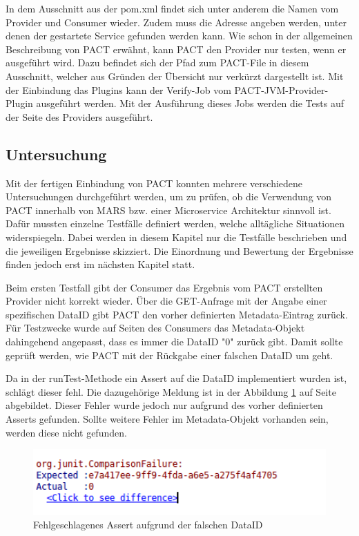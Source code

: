 \documentclass{llncs}
\begin{document}
In dem Ausschnitt aus der pom.xml findet sich unter anderem die Namen vom Provider und Consumer wieder. Zudem muss die Adresse angeben werden, unter denen der gestartete Service gefunden werden kann. Wie schon in der allgemeinen Beschreibung von PACT erwähnt, kann PACT den Provider nur testen, wenn er ausgeführt wird. Dazu befindet sich der Pfad zum PACT-File in diesem Ausschnitt, welcher aus Gründen der Übersicht nur verkürzt dargestellt ist.
Mit der Einbindung das Plugins kann der Verify-Job vom  PACT-JVM-Provider-Plugin ausgeführt werden. Mit der Ausführung dieses Jobs werden die Tests auf der Seite des Providers ausgeführt.

\subsection{Untersuchung}
Mit der fertigen Einbindung von PACT konnten mehrere verschiedene Untersuchungen durchgeführt werden, um zu prüfen, ob die Verwendung von PACT innerhalb von MARS bzw. einer Microservice Architektur sinnvoll ist. Dafür mussten einzelne Testfälle definiert werden, welche alltägliche Situationen widerspiegeln. Dabei werden in diesem Kapitel nur die Testfälle beschrieben und die jeweiligen Ergebnisse skizziert. Die Einordnung und Bewertung der Ergebnisse finden jedoch erst im nächsten Kapitel statt.

Beim ersten Testfall gibt der Consumer das Ergebnis vom PACT erstellten Provider nicht korrekt wieder. Über die GET-Anfrage mit der Angabe einer spezifischen DataID gibt PACT den vorher definierten Metadata-Eintrag zurück. Für Testzwecke wurde auf Seiten des Consumers das Metadata-Objekt dahingehend angepasst, dass es immer die DataID "0" zurück gibt. Damit sollte geprüft werden, wie PACT mit der Rückgabe einer falschen DataID um geht.

Da in der runTest-Methode ein Assert auf die DataID implementiert wurden ist, schlägt dieser fehl. Die dazugehörige Meldung ist in der Abbildung \ref{fig:ErrorConsumerGet} auf Seite \pageref{fig:ErrorConsumerGet} abgebildet. Dieser Fehler wurde jedoch nur aufgrund des vorher definierten Asserts gefunden. Sollte weitere Fehler im Metadata-Objekt vorhanden sein, werden diese nicht gefunden.

\begin{figure}[htbp]
  \centering
      \includegraphics[width=1\textwidth]{./Images/Error_Consumer-GET}
    \caption{Fehlgeschlagenes Assert aufgrund der falschen DataID}
    \label{fig:ErrorConsumerGet}
\end{figure}
\end{document}
